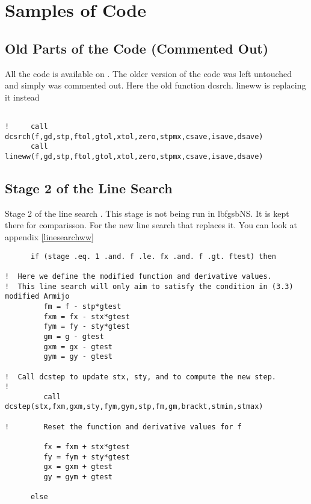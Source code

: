 
\chapter{Samples of Code} %

\label{AppendixA} %


\section{Old Parts of the Code (Commented Out)}
All the code is available on \citep{lbfgsbNS} \label{ignoredcode}. The older version of the code was left untouched and simply was commented out. Here the old function dcsrch. lineww is replacing it instead
\begin{lstlisting}

!     call dcsrch(f,gd,stp,ftol,gtol,xtol,zero,stpmx,csave,isave,dsave)
      call lineww(f,gd,stp,ftol,gtol,xtol,zero,stpmx,csave,isave,dsave)

\end{lstlisting}

\section{Stage 2 of the Line Search}
Stage 2 of the line search\citep{lbfgsbsoftware} \label{stage2}. This stage is not being run in lbfgsbNS. It is kept there for comparisson. For the new line search that replaces it. You can look at appendix \ref{linesearchww}
\begin{lstlisting}
      if (stage .eq. 1 .and. f .le. fx .and. f .gt. ftest) then

!  Here we define the modified function and derivative values.
!  This line search will only aim to satisfy the condition in (3.3) modified Armijo
         fm = f - stp*gtest
         fxm = fx - stx*gtest
         fym = fy - sty*gtest
         gm = g - gtest
         gxm = gx - gtest
         gym = gy - gtest

!  Call dcstep to update stx, sty, and to compute the new step.
!
         call dcstep(stx,fxm,gxm,sty,fym,gym,stp,fm,gm,brackt,stmin,stmax)

!        Reset the function and derivative values for f

         fx = fxm + stx*gtest
         fy = fym + sty*gtest
         gx = gxm + gtest
         gy = gym + gtest

      else
\end{lstlisting}

